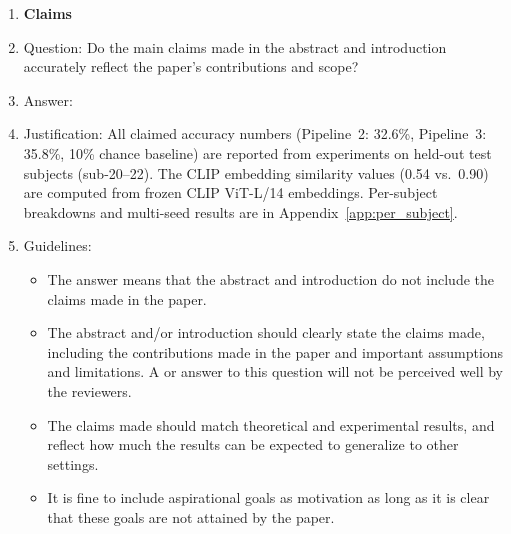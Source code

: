 \documentclass{article}
\begin{document}
\begin{enumerate}

\item {\bf Claims}
    \item[] Question: Do the main claims made in the abstract and introduction accurately reflect the paper's contributions and scope?
    \item[] Answer: \answerYes{}
    \item[] Justification: All claimed accuracy numbers (Pipeline~2: 32.6\%, Pipeline~3: 35.8\%, 10\% chance baseline) are reported from experiments on held-out test subjects (sub-20--22). The CLIP embedding similarity values (0.54 vs.\ 0.90) are computed from frozen CLIP ViT-L/14 embeddings. Per-subject breakdowns and multi-seed results are in Appendix~\ref{app:per_subject}.
    \item[] Guidelines:
    \begin{itemize}
        \item The answer \answerNA{} means that the abstract and introduction do not include the claims made in the paper.
        \item The abstract and/or introduction should clearly state the claims made, including the contributions made in the paper and important assumptions and limitations. A \answerNo{} or \answerNA{} answer to this question will not be perceived well by the reviewers.
        \item The claims made should match theoretical and experimental results, and reflect how much the results can be expected to generalize to other settings.
        \item It is fine to include aspirational goals as motivation as long as it is clear that these goals are not attained by the paper.
    \end{itemize}


\end{enumerate}
\end{document}
